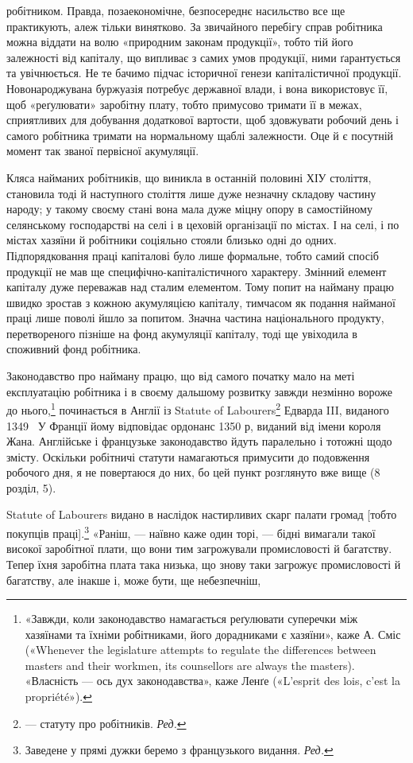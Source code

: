 \parcont{}  %
робітником. Правда, позаекономічне, безпосереднє насильство
все ще практикують, алеж тільки винятково. За звичайного
перебігу справ робітника можна віддати на волю «природним
законам продукції», тобто тій його залежності від капіталу,
що випливає з самих умов продукції, ними ґарантується та увічнюється.
Не те бачимо підчас історичної генези капіталістичної
продукції. Новонароджувана буржуазія потребує державної
влади, і вона використовує її, щоб «реґулювати» заробітну плату,
тобто примусово тримати її в межах, сприятливих для добування
додаткової вартости, щоб здовжувати робочий день і самого робітника
тримати на нормальному щаблі залежности. Оце й є
посутній момент так званої первісної акумуляції.

Кляса найманих робітників, що виникла в останній половині
ХІУ століття, становила тоді й наступного століття лише дуже
незначну складову частину народу; у такому своєму стані вона
мала дуже міцну опору в самостійному селянському господарстві
на селі і в цеховій організації по містах. І на селі, і по містах
хазяїни й робітники соціяльно стояли близько одні до одних.
Підпорядковання праці капіталові було лише формальне, тобто
самий спосіб продукції не мав ще специфічно-капіталістичного
характеру. Змінний елемент капіталу дуже переважав над сталим
елементом. Тому попит на найману працю швидко зростав
з кожною акумуляцією капіталу, тимчасом як подання найманої
праці лише поволі йшло за попитом. Значна частина національного
продукту, перетвореного пізніше на фонд акумуляції капіталу,
тоді ще увіходила в споживний фонд робітника.

Законодавство про найману працю, що від самого початку
мало на меті експлуатацію робітника і в своєму дальшому розвитку
завжди незмінно вороже до нього,\footnote{
«Завжди, коли законодавство намагається реґулювати суперечки
між хазяїнами та їхніми робітниками, його дорадниками є хазяїни», каже
А. Сміс («Whenever the legislature attempts to regulate the differences
between masters and their workmen, its counsellors are always the masters).
«Власність — ось дух законодавства», каже Ленґе («L’esprit des
lois, c’est la propriété»).
} починається в Англії
із Statute of Labourers\footnote*{
— статуту про робітників. \emph{Ред.}
} Едварда III, виданого 1349~ У Франції
йому відповідає ордонанс 1350 р, виданий від імени короля
Жана. Англійське і французьке законодавство йдуть паралельно
і тотожні щодо змісту. Оскільки робітничі статути намагаються
примусити до подовження робочого дня, я не повертаюся до них,
бо цей пункт розглянуто вже вище (8 розділ, 5).

Statute of Labourers видано в наслідок настирливих скарг
палати громад [тобто покупців праці].\footnote*{
Заведене у прямі дужки беремо з французького видання. \emph{Ред.}
} «Раніш, — наївно каже
один торі, — бідні вимагали такої високої заробітної плати, що
вони тим загрожували промисловості й багатству. Тепер їхня
заробітна плата така низька, що знову таки загрожує промисловості
й багатству, але інакше і, може бути, ще небезпечніш,
\parbreak{}  %
